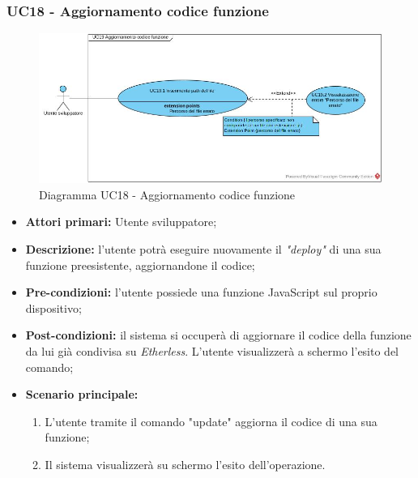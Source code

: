 \subsubsection{UC18 - Aggiornamento codice funzione}
\begin{figure}[h]
	\centering
	\includegraphics[width=\linewidth]{res/img/UC18.jpg}
	\caption{Diagramma UC18 - Aggiornamento codice funzione}
\end{figure}
\begin{itemize}
	\item \textbf{Attori primari:} Utente sviluppatore;
	\item \textbf{Descrizione:} l'utente potrà eseguire nuovamente il \textit{"deploy\glos"} di una sua funzione preesistente, aggiornandone il codice;
	\item \textbf{Pre-condizioni:} l'utente possiede una funzione JavaScript sul proprio dispositivo;
	\item \textbf{Post-condizioni:} il sistema si occuperà di aggiornare il codice della funzione da lui già condivisa su \textit{Etherless}. L'utente visualizzerà a schermo l'esito del comando;
	\item \textbf{Scenario principale:} 
	\begin{enumerate}
		\item L'utente tramite il comando "update" aggiorna il codice di una sua funzione;
		\item Il sistema visualizzerà su schermo l'esito dell'operazione.
	\end{enumerate}
\end{itemize}

